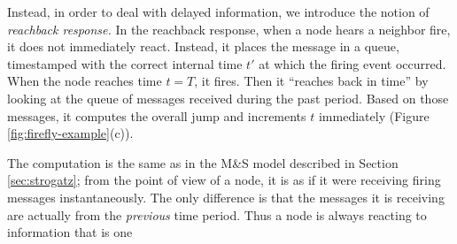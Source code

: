 \documentclass{sig-alternate}
\begin{document}
Instead, in order to deal with delayed information, we introduce the
notion of {\em reachback response.} In the reachback response, when a
node hears a neighbor fire, it does not immediately react. Instead, it
places the message in a queue, timestamped with the correct internal
time $t'$ at which the firing event occurred. When the node reaches
time $t=T$, it fires. Then it ``reaches back in time'' by looking at
the queue of messages received during the past period. Based on those
messages, it computes the overall jump and increments $t$ immediately
(Figure \ref{fig:firefly-example}(c)).

The computation is the same as in the M\&S model described in Section
\ref{sec:strogatz}; from the point of view of a node, it is as if it
were receiving firing messages instantaneously. The only difference is
that the messages it is receiving are actually from the {\em previous}
time period. Thus a node is always reacting to information that is one
\end{document}
